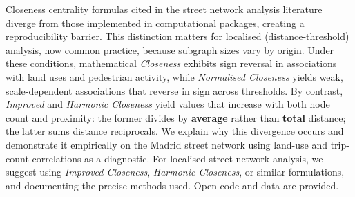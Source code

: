 Closeness centrality formulas cited in the street network analysis literature diverge from those implemented in computational packages, creating a reproducibility barrier. This distinction matters for localised (distance-threshold) analysis, now common practice, because subgraph sizes vary by origin. Under these conditions, mathematical \emph{Closeness} exhibits sign reversal in associations with land uses and pedestrian activity, while \emph{Normalised Closeness} yields weak, scale-dependent associations that reverse in sign across thresholds. By contrast, \emph{Improved} and \emph{Harmonic Closeness} yield values that increase with both node count and proximity: the former divides by \textbf{average} rather than \textbf{total} distance; the latter sums distance reciprocals. We explain why this divergence occurs and demonstrate it empirically on the Madrid street network using land-use and trip-count correlations as a diagnostic. For localised street network analysis, we suggest using \emph{Improved Closeness}, \emph{Harmonic Closeness}, or similar formulations, and documenting the precise methods used. Open code and data are provided.
